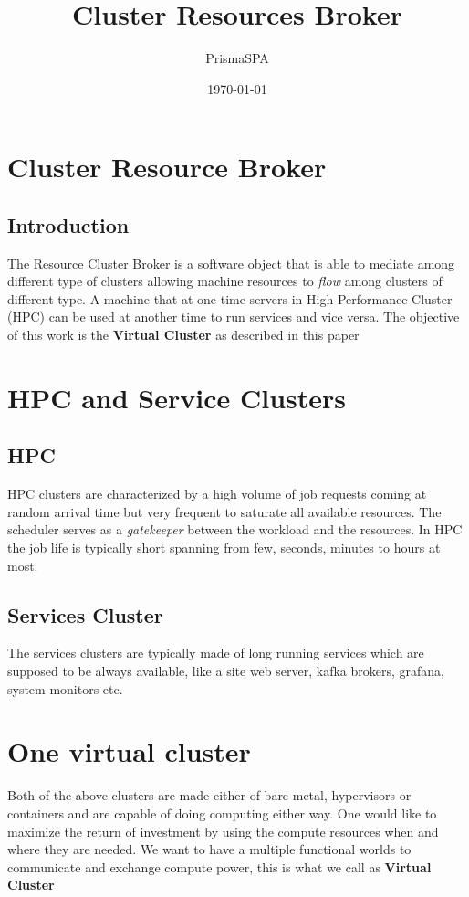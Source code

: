 \documentclass{report}
\title{\huge\textbf{Cluster Resources Broker}}
\author{PrismaSPA}
\date{\today}
\begin{document}
\maketitle
\tableofcontents


\chapter{Cluster Resource Broker}

\section{Introduction}
The Resource Cluster Broker is a software object that is able to mediate among different type of clusters allowing machine resources to \textit{flow} among clusters of different type. A machine that at one time servers in High Performance Cluster (HPC) can be used at another time to run services and vice versa. The objective of this work is the \textbf{Virtual Cluster} as described in this paper

\chapter{HPC and Service Clusters}

\section{HPC}
HPC clusters are characterized by a high volume of job requests coming at random arrival time but very frequent to saturate all available resources. The scheduler serves as a \textit{gatekeeper} between the workload and the resources. In HPC the job life is typically short spanning from few, seconds, minutes to hours at most.

\section{Services Cluster}
The services clusters are typically made of long running services which are supposed to be always available, like a site web server, kafka brokers, grafana, system monitors etc.

\chapter{One virtual cluster}

Both of the above clusters are made either of bare metal, hypervisors or containers and are capable of doing computing either way. One would like to maximize the return of investment by using the compute resources when and where they are needed. We want to have a multiple functional worlds to communicate and exchange compute power, this is what we call as \textbf{Virtual Cluster}\\
\end{document}
